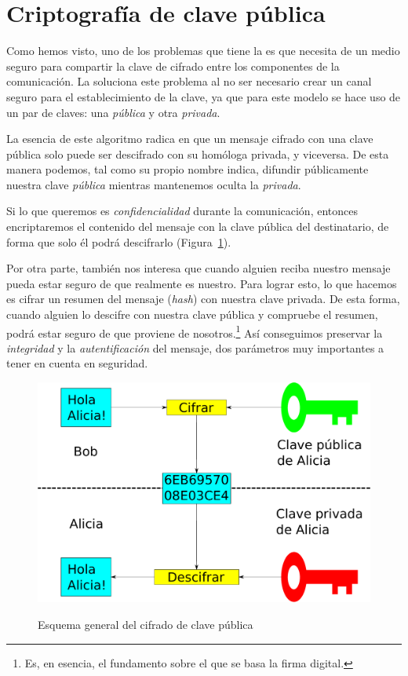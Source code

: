  \section{Criptografía de clave pública}

 Como hemos visto, uno de los problemas que tiene la  es que necesita de un medio seguro para compartir la clave de cifrado entre los componentes de la comunicación.
 La  soluciona este problema al no ser necesario crear un canal seguro para el establecimiento de la clave, ya que para este modelo se hace uso de un par de claves: una \emph{pública} y otra \emph{privada}.

 La esencia de este algoritmo radica en que un mensaje cifrado con una clave pública solo puede ser descifrado con su homóloga privada, y viceversa.
 De esta manera podemos, tal como su propio nombre indica, difundir públicamente nuestra clave \emph{pública} mientras mantenemos oculta la \emph{privada}.

 Si lo que queremos es \emph{confidencialidad} durante la comunicación, entonces encriptaremos el contenido del mensaje con la clave pública del destinatario, de forma que solo él podrá descifrarlo (Figura~\ref{fig:PublicKeyEncryption}).

 Por otra parte, también nos interesa que cuando alguien reciba nuestro mensaje pueda estar seguro de que realmente es nuestro.
 Para lograr esto, lo que hacemos es cifrar un resumen del mensaje (\emph{hash}) con nuestra clave privada.
 De esta forma, cuando alguien lo descifre con nuestra clave pública y compruebe el resumen, podrá estar seguro de que proviene de nosotros.\footnote{Es, en esencia, el fundamento sobre el que se basa la firma digital.}
 Así conseguimos preservar la \emph{integridad} y la \emph{autentificación} del mensaje, dos parámetros muy importantes a tener en cuenta en seguridad. \emph{\parencite{Reference14}}

 \begin{figure}[ht]
   \centering
   \includegraphics[scale=0.5]{Figures/PublicKeyEncryption}
   \decoRule
   \caption[Cifrado de clave pública (Esquema)]{Esquema general del cifrado de clave pública} \emph{\parencite{Reference5}}
   \label{fig:PublicKeyEncryption}
 \end{figure}

